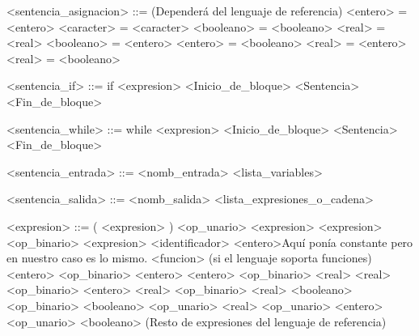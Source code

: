 \documentclass{scrartcl}
\begin{document}
\begin{grammar}
<sentencia_asignacion> ::= (Dependerá del lenguaje de referencia)
\alt <entero> = <entero>
\alt <caracter> = <caracter>
\alt <booleano> = <booleano>
\alt <real> = <real>
\alt <booleano> = <entero>
\alt <entero> = <booleano>
\alt <real> = <entero>
\alt <real> = <booleano>

<sentencia_if> ::= if <expresion> <Inicio_de_bloque>
 <Sentencia>
 <Fin_de_bloque>

<sentencia_while> ::= while <expresion> <Inicio_de_bloque>
<Sentencia>
<Fin_de_bloque>

<sentencia_entrada> ::= <nomb_entrada> <lista_variables>

<sentencia_salida> ::= <nomb_salida> <lista_expresiones_o_cadena>

<expresion> ::= ( <expresion> )
\alt <op_unario> <expresion>
\alt <expresion> <op_binario> <expresion>
\alt <identificador>
\alt <entero>Aquí ponía constante pero en nuestro caso es lo mismo.
\alt <funcion> (si el lenguaje soporta funciones)
\alt <entero> <op_binario> <entero>
\alt <entero> <op_binario> <real>
\alt <real> <op_binario> <entero>
\alt <real> <op_binario> <real>
\alt <booleano> <op_binario> <booleano>
\alt <op_unario> <real>
\alt <op_unario> <entero>
\alt <op_unario> <booleano>
\alt (Resto de expresiones del lenguaje de referencia)


\end{grammar}
\end{document}
